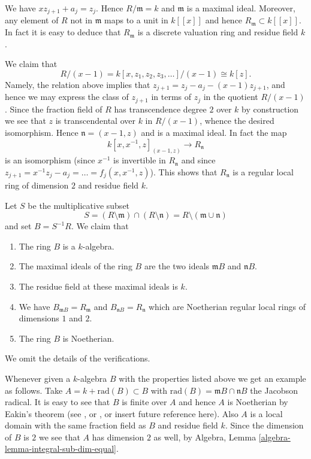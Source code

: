 \medskip\noindent
We have $xz_{j + 1} + a_j = z_j$. Hence $R/\mathfrak m = k$
and $\mathfrak m$ is a maximal ideal. Moreover, any element of $R$
not in $\mathfrak m$ maps to a unit in $k[[x]]$ and hence
$R_{\mathfrak m} \subset k[[x]]$. In fact it is easy to deduce
that $R_{\mathfrak m}$ is a discrete valuation ring and residue
field $k$.

\medskip\noindent
We claim that
$$
R/(x - 1) =
k[x, z_1, z_2, z_3, \ldots ]/(x - 1)
\cong
k[z].
$$
Namely, the relation above implies that
$z_{j + 1} = z_j - a_j - (x - 1)z_{j + 1}$, and hence
we may express the class of $z_{j + 1}$ in terms of $z_j$ in
the quotient $R/(x - 1)$. Since the fraction field of $R$
has transcendence degree $2$ over $k$ by construction we see that $z$ is
transcendental over $k$ in $R/(x - 1)$, whence the desired isomorphism.
Hence $\mathfrak n = (x - 1, z)$ and is a maximal ideal. In fact the
map
$$
k[x, x^{-1}, z]_{(x - 1, z)} \longrightarrow R_{\mathfrak n}
$$
is an isomorphism (since $x^{-1}$ is invertible in $R_{\mathfrak n}$
and since $z_{j + 1} = x^{-1}z_j - a_j = \ldots = f_j(x, x^{-1}, z)$).
This shows that $R_{\mathfrak n}$ is a regular local ring
of dimension $2$ and residue field $k$.

\medskip\noindent
Let $S$ be the multiplicative subset
$$
S =
(R \setminus \mathfrak m) \cap (R \setminus \mathfrak n) =
R \setminus (\mathfrak m \cup \mathfrak n)
$$
and set $B = S^{-1}R$. We claim that
\begin{enumerate}
\item The ring $B$ is a $k$-algebra.
\item The maximal ideals of the ring $B$ are the two ideals
$\mathfrak mB$ and $\mathfrak nB$.
\item The residue field at these maximal ideals is $k$.
\item We have $B_{\mathfrak mB} = R_{\mathfrak m}$
and $B_{\mathfrak nB} = R_{\mathfrak n}$
which are Noetherian regular local rings of dimensions $1$ and $2$.
\item The ring $B$ is Noetherian.
\end{enumerate}
We omit the details of the verifications.

\medskip\noindent
Whenever given a $k$-algebra $B$ with the properties listed above we
get an example as follows. Take $A = k + \text{rad}(B) \subset B$
with $\text{rad}(B) = \mathfrak mB \cap \mathfrak nB$ the Jacobson radical.
It is easy to see that $B$ is finite over $A$ and hence $A$ is
Noetherian by Eakin's theorem (see \cite{Eakin}, or
\cite[Appendix A1]{Nagata}, or insert future reference here).
Also $A$ is a local domain with the same fraction field as $B$ and
residue field $k$. Since the dimension of $B$ is $2$ we see that $A$
has dimension $2$ as well, by
Algebra, Lemma \ref{algebra-lemma-integral-sub-dim-equal}.

